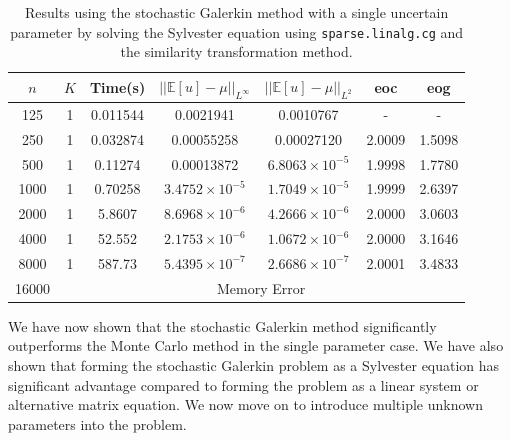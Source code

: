 \documentclass[11pt]{article}
\numberwithin{equation}{section}
\begin{document}
\begin{table}[H]
\centering
\begin{tabular}{|c|c|c|c|c|c|c|}
\hline
$n$ & $K$ & Time(s) & $|| \mathbb{E}[u] - \mu ||_{L^{\infty}}$ & $|| \mathbb{E}[u] - \mu ||_{L^{2}}$ & eoc & eog \\
\hline
125 & 1 & 0.011544 & 0.0021941 & 0.0010767 & - & - \\
250 & 1 & 0.032874 & 0.00055258 &  0.00027120 & 2.0009 & 1.5098 \\
500 & 1 & 0.11274 & 0.00013872 & $6.8063 \times 10^{-5}$ & 1.9998 & 1.7780 \\
1000 & 1 &  0.70258 & $3.4752 \times 10^{-5}$ & $1.7049 \times 10^{-5}$ & 1.9999 & 2.6397 \\
2000 & 1 & 5.8607 & $8.6968 \times 10^{-6}$ & $4.2666 \times 10^{-6}$ & 2.0000 & 3.0603 \\
4000 & 1 & 52.552 & $2.1753 \times 10^{-6}$ & $1.0672 \times 10^{-6}$ & 2.0000 & 3.1646 \\
8000 & 1 & 587.73 & $5.4395 \times 10^{-7}$ & $2.6686 \times 10^{-7}$ & 2.0001 & 3.4833 \\
\cline{2-7}
16000 & \multicolumn{6}{c|}{Memory Error} \\
\hline
\end{tabular}
\captionsetup{justification=centering}
\caption{Results using the stochastic Galerkin method with a single uncertain parameter by solving the Sylvester equation using \texttt{sparse.linalg.cg} and the similarity transformation method.}
\label{table:stochastic sylvester}
\end{table} 

We have now shown that the stochastic Galerkin method significantly outperforms the Monte Carlo method in the single parameter case. We have also shown that forming the stochastic Galerkin problem as a Sylvester equation has significant advantage compared to forming the problem as a linear system or alternative matrix equation. We now move on to introduce multiple unknown parameters into the problem.

\newpage
\end{document}
